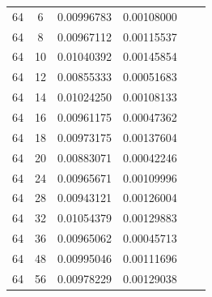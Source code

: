 \documentclass[letterpaper,12pt]{article}
\theoremstyle{remark}
\begin{document}
\begin{tabular}{cccccc}
64 & 6 & 0.00996783 & 0.00108000 \\
64 & 8 & 0.00967112 & 0.00115537 \\
64 & 10 & 0.01040392 & 0.00145854 \\
64 & 12 & 0.00855333 & 0.00051683 \\
64 & 14 & 0.01024250 & 0.00108133 \\
64 & 16 & 0.00961175 & 0.00047362 \\
64 & 18 & 0.00973175 & 0.00137604 \\
64 & 20 & 0.00883071 & 0.00042246 \\
64 & 24 & 0.00965671 & 0.00109996 \\
64 & 28 & 0.00943121 & 0.00126004 \\
64 & 32 & 0.01054379 & 0.00129883 \\
64 & 36 & 0.00965062 & 0.00045713 \\
64 & 48 & 0.00995046 & 0.00111696 \\
64 & 56 & 0.00978229 & 0.00129038 \\
\end{tabular}
\end{document}
